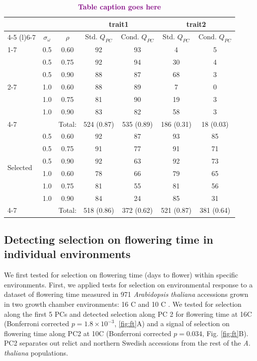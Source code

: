 \documentclass[11pt,letterpaper]{article}
\newcommand{\dothis}[1]{\textcolor{purple}{\textbf{#1}}}
\begin{document}
\nolinenumbers
\begin{table}[ht]

\begin{tabular}{lcccccc} 
 \toprule
 \multicolumn{3}{c}{}& \multicolumn{2}{c}{trait1} & \multicolumn{2}{c}{trait2} \\\cmidrule(l){4-5} \cmidrule(l){6-7}
 & $\sigma_\omega$& $\rho$& Std. $Q_{PC}$& Cond. $Q_{PC}$& Std. $Q_{PC}$& Cond. $Q_{PC}$ \\\cmidrule{1-7} 
 \multirow{6}{*}{Neutral}& 0.5& 0.60& 92& 93& 4& 5 \\
 & 0.5& 0.75& 92& 94& 30 & 4 \\
 & 0.5& 0.90& 88& 87& 68 & 3 \\\cmidrule{2-7}
 & 1.0& 0.60& 88& 89& 7& 0 \\
 &  1.0& 0.75& 81& 90& 19& 3 \\
 &  1.0& 0.90& 83& 82& 58& 3 \\\cmidrule{4-7}
 & & Total:& 524 (0.87)& 535 (0.89)& 186 (0.31)& 18 (0.03)\\
 \midrule
 \multirow{6}{*}{Selected}& 0.5& 0.60& 92& 87& 93& 85 \\
 & 0.5& 0.75& 91& 77& 91& 71 \\
 & 0.5& 0.90& 92& 63& 92& 73 \\\cmidrule{2-7}
 & 1.0& 0.60& 78& 66& 79& 65 \\
 & 1.0& 0.75& 81& 55& 81& 56 \\
 & 1.0& 0.90& 84& 24& 85& 31 \\\cmidrule{4-7}
 & & Total:& 518 (0.86)& 372 (0.62)& 521 (0.87)& 381 (0.64)\\
 \bottomrule

\end{tabular}
\caption{\dothis{Table caption goes here}}
 \label{table:sims}
\end{table}

\linenumbers

\subsection*{Detecting selection on flowering time in individual environments}
We first tested for selection on flowering time (days to flower) within specific environments.
First, we applied tests for selection on environmental response to a dataset of flowering time measured in 971 \textit{Arabidopsis thaliana} accessions grown in two growth chamber environments: 16 \degree C and 10 \degree C \cite{alonso20161}.
We tested for selection along the first 5 PCs and detected selection along PC 2 for flowering time at 16\degree C (Bonferroni corrected $p = 1.8 \times 10^{-3}$, \ref{fig:ft}A) and a signal of selection on flowering time along PC2 at 10\degree C (Bonferroni corrected $p = 0.034$, Fig. \ref{fig:ft}B).
PC2 separates out relict and northern Swedish accessions from the rest of the \textit{A. thaliana} populations.
\end{document}
